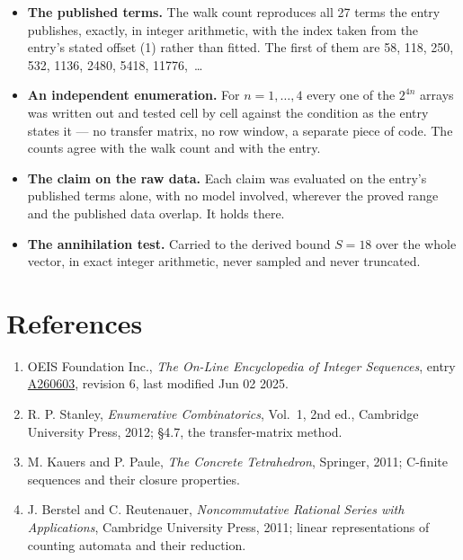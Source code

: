 \documentclass[11pt]{article}
\theoremstyle{definition}
\begin{document}
\begin{itemize}

\item {\bfseries The published terms.} The walk count reproduces all 27 terms the entry publishes, exactly, in integer arithmetic, with the index taken from the entry's stated offset (1) rather than fitted. The first of them are 58, 118, 250, 532, 1136, 2480, 5418, 11776,~\dots

\item {\bfseries An independent enumeration.} For $n = 1,\dots,4$ every one of the $2^{4n}$ arrays was written out and tested cell by cell against the condition as the entry states it --- no transfer matrix, no row window, a separate piece of code. The counts agree with the walk count and with the entry.

\item {\bfseries The claim on the raw data.} Each claim was evaluated on the entry's published terms alone, with no model involved, wherever the proved range and the published data overlap. It holds there.

\item {\bfseries The annihilation test.} Carried to the derived bound $S = 18$ over the whole vector, in exact integer arithmetic, never sampled and never truncated.

\end{itemize}

\section{References}

\begin{enumerate}

\item OEIS Foundation Inc., \emph{The On-Line Encyclopedia of Integer Sequences}, entry \href{https://oeis.org/A260603}{A260603}, revision 6, last modified Jun 02 2025.

\item R. P. Stanley, \emph{Enumerative Combinatorics}, Vol.~1, 2nd ed., Cambridge University Press, 2012; \S4.7, the transfer-matrix method.

\item M. Kauers and P. Paule, \emph{The Concrete Tetrahedron}, Springer, 2011; C-finite sequences and their closure properties.

\item J. Berstel and C. Reutenauer, \emph{Noncommutative Rational Series with Applications}, Cambridge University Press, 2011; linear representations of counting automata and their reduction.

\end{enumerate}
\end{document}
